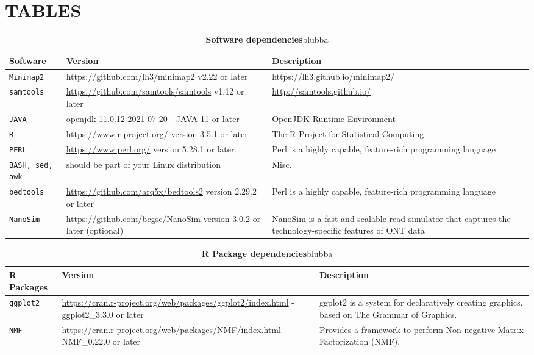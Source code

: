 \documentclass[times, 11pt, a4paper]{article}
\begin{document}
\section*{TABLES}

\begin{table}[]
\label{tab:software}
\begin{tabular}{|p{1.5cm}|p{7cm}|p{6.5cm}|}
\hline 
            Software & Version & Description \\ 
            \hline \hline
            \texttt{Minimap2} & \url{https://github.com/lh3/minimap2} v2.22 or later & \url{https://lh3.github.io/minimap2/} \\ \hline
            \texttt{samtools} & \url{https://github.com/samtools/samtools} v1.12 or later & \url{http://samtools.github.io/} \\ \hline
	   \texttt{JAVA} & openjdk 11.0.12 2021-07-20 - JAVA 11 or later & OpenJDK Runtime Environment\\ \hline
	   \texttt{R} &  \url{https://www.r-project.org/} version 3.5.1 or later & The R Project for Statistical Computing \\ \hline
	   \texttt{PERL} &  \url{https://www.perl.org/} version 5.28.1 or later & Perl is a highly capable, feature-rich programming language \\ \hline
	   \texttt{BASH, sed, awk} &  should be part of your Linux distribution & Misc.\\ \hline
	   \texttt{bedtools} &  \url{https://github.com/arq5x/bedtools2} version 2.29.2 or later & Perl is a highly capable, feature-rich programming language \\ \hline	   
	   \texttt{NanoSim} &  \url{https://github.com/bcgsc/NanoSim} version 3.0.2 or later (optional) & NanoSim is a fast and scalable read simulator that captures the technology-specific features of ONT data\\ \hline	   
\end{tabular}
\caption{\textbf{Software dependencies}\label{tab:software} blubba}
\end{table}

\begin{table}[]
\label{tab:packages}
\begin{tabular}{|p{1.5cm}|p{7cm}|p{6.5cm}|}
\hline 
            R Packages & Version & Description \\ 
            \hline \hline
            \texttt{ggplot2} & \url{https://cran.r-project.org/web/packages/ggplot2/index.html} - ggplot2\_3.3.0 or later &  ggplot2 is a system for declaratively creating graphics, based on The Grammar of Graphics. \\ \hline
            \texttt{NMF} & \url{https://cran.r-project.org/web/packages/NMF/index.html} - NMF\_0.22.0 or later &  Provides a framework to perform Non-negative Matrix Factorization (NMF). \\ \hline
\end{tabular}
\caption{\textbf{R Package dependencies}\label{tab:software} blubba}
\end{table}
\end{document}
